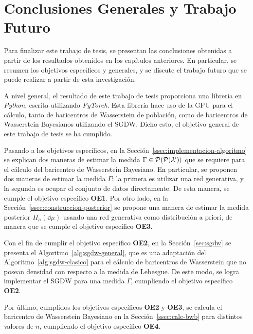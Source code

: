 \chapter{Conclusiones Generales y Trabajo Futuro}\label{chap:conclusiones-generales}  %

Para finalizar este trabajo de tesis, se presentan las conclusiones obtenidas a partir de los resultados obtenidos en los capítulos anteriores. En particular, se resumen los objetivos específicos y generales, y se discute el trabajo futuro que se puede realizar a partir de esta investigación.

A nivel general, el resultado de este trabajo de tesis proporciona una librería en \textit{Python}, escrita utilizando \textit{PyTorch}. Esta librería hace uso de la GPU para el cálculo, tanto de baricentros de Wasserstein de población, como de baricentros de Wasserstein Bayesianos utilizando el SGDW. Dicho esto, el objetivo general de este trabajo de tesis se ha cumplido.

Pasando a los objetivos específicos, en la Sección~\ref{ssec:implementacion-algoritmo} se explican dos maneras de estimar la medida $\Gamma \in \ProbSpace[\ProbSpace[\cX]]$ que se requiere para el cálculo del baricentro de Wasserstein Bayesiano. En particular, se proponen dos maneras de estimar la medida $\Gamma$: la primera es utilizar una red generativa, y la segunda es ocupar el conjunto de datos directamente. De esta manera, se cumple el objetivo específico \textbf{OE1}. Por otro lado, en la Sección~\ref{ssec:construccion-posterior} se propone una manera de estimar la medida posterior $\Pi_n(\dd \mu)$ usando una red generativa como distribución a priori, de manera que se cumple el objetivo específico \textbf{OE3}.

Con el fin de cumplir el objetivo específico \textbf{OE2}, en la Sección~\ref*{sec:sgdw} se presenta el Algoritmo~\ref{alg:sgdw-general}, que es una adaptación del Algoritmo~\ref{alg:sgdw-clasico} para el cálculo de baricentros de Wasserstein que no posean densidad con respecto a la medida de Lebesgue. De este modo, se logra implementar el SGDW para una medida $\Gamma$, cumpliendo el objetivo específico \textbf{OE2}.

Por último, cumplidos los objetivos específicos \textbf{OE2} y \textbf{OE3}, se calcula el baricentro de Wasserstein Bayesiano en la Sección~\ref{ssec:calc-bwb} para distintos valores de $n$, cumpliendo el objetivo específico \textbf{OE4}.

